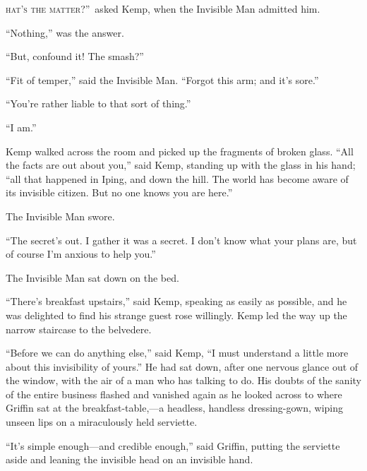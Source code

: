 \label{ch:19}
\begin{ChapterStart}
\vspace*{2\nbs}

\vspace{1.5\nbs}
\vspace{0.75\nbs}
\end{ChapterStart}

\kern-4pt\textsc{hat’s the matter}?”\ asked Kemp, when the Invisible Man admitted him.

“Nothing,” was the answer.

“But, confound it! The smash?”

“Fit of temper,” said the Invisible Man. “Forgot this arm; and it’s sore.”

“You’re rather liable to that sort of thing.”

“I am.”

Kemp walked across the room and picked up the fragments of broken glass. “All the facts are out about you,” said Kemp, standing up with the glass in his hand; “all that happened in Iping, and down the hill. The world has become aware of its invisible citizen. But no one knows you are here.”

The Invisible Man swore.

“The secret’s out. I gather it was a secret. I don’t know what your plans are, but of course I’m anxious to help you.”

The Invisible Man sat down on the bed.

“There’s breakfast upstairs,” said Kemp, speaking as easily as possible, and he was delighted to find his strange guest rose willingly. Kemp led the way up the narrow staircase to the belvedere.

“Before we can do anything else,” said Kemp, “I must understand a little more about this invisibility of yours.” He had sat down, after one nervous glance out of the window, with the air of a man who has talking to do. His doubts of the sanity of the entire business flashed and vanished again as he looked across to where Griffin sat at the breakfast-table,—a headless, handless dressing-gown, wiping unseen lips on a miraculously held serviette.

“It’s simple enough—and credible enough,” said Griffin, putting the serviette aside and leaning the invisible head on an invisible hand.


